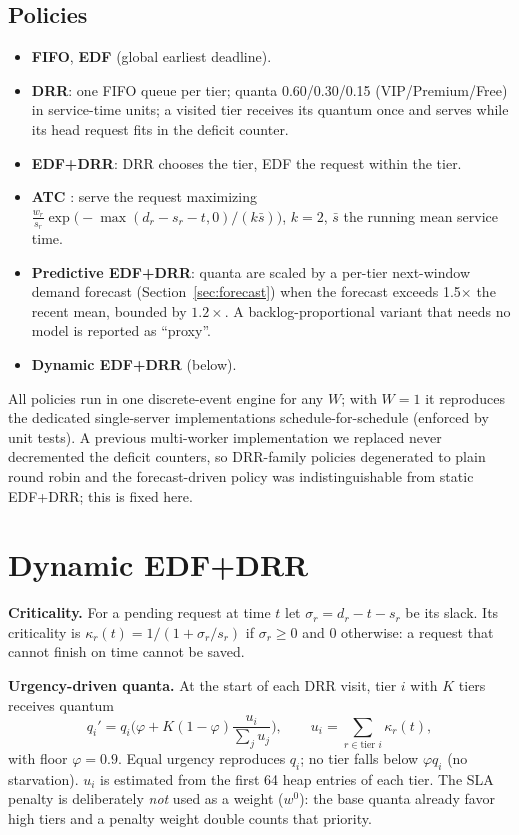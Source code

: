 \documentclass[conference]{IEEEtran}
\begin{document}
\subsection{Policies}
\begin{itemize}
\item \textbf{FIFO}, \textbf{EDF} (global earliest deadline).
\item \textbf{DRR}: one FIFO queue per tier; quanta 0.60/0.30/0.15 (VIP/Premium/Free) in service-time units; a visited tier receives its quantum once and serves while its head request fits in the deficit counter.
\item \textbf{EDF+DRR}: DRR chooses the tier, EDF the request within the tier.
\item \textbf{ATC} \cite{vepsalainen1987}: serve the request maximizing $\frac{w_r}{s_r}\exp\!\big(-\max(d_r-s_r-t,0)/(k\bar s)\big)$, $k=2$, $\bar s$ the running mean service time.
\item \textbf{Predictive EDF+DRR}: quanta are scaled by a per-tier next-window demand forecast (Section~\ref{sec:forecast}) when the forecast exceeds 1.5$\times$ the recent mean, bounded by $1.2\times$. A backlog-proportional variant that needs no model is reported as ``proxy''.
\item \textbf{Dynamic EDF+DRR} (below).
\end{itemize}
All policies run in one discrete-event engine for any $W$; with $W=1$ it reproduces the dedicated single-server implementations schedule-for-schedule (enforced by unit tests). A previous multi-worker implementation we replaced never decremented the deficit counters, so DRR-family policies degenerated to plain round robin and the forecast-driven policy was indistinguishable from static EDF+DRR; this is fixed here.

\section{Dynamic EDF+DRR}
\label{sec:dynamic}

\textbf{Criticality.} For a pending request at time $t$ let $\sigma_r=d_r-t-s_r$ be its slack. Its criticality is $\kappa_r(t)=1/(1+\sigma_r/s_r)$ if $\sigma_r\ge0$ and $0$ otherwise: a request that cannot finish on time cannot be saved.

\textbf{Urgency-driven quanta.} At the start of each DRR visit, tier $i$ with $K$ tiers receives quantum
\begin{equation}
q_i' = q_i\Big(\varphi + K(1-\varphi)\frac{u_i}{\sum_ju_j}\Big),\qquad u_i=\sum_{r\in\text{tier }i}\kappa_r(t),
\end{equation}
with floor $\varphi=0.9$. Equal urgency reproduces $q_i$; no tier falls below $\varphi q_i$ (no starvation). $u_i$ is estimated from the first 64 heap entries of each tier. The SLA penalty is deliberately \emph{not} used as a weight ($w^0$): the base quanta already favor high tiers and a penalty weight double counts that priority.
\end{document}
